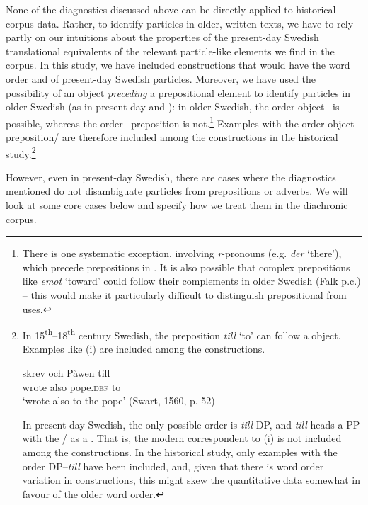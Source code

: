 \documentclass[output=paper]{langscibook}
\begin{document}
None of the diagnostics discussed above can be directly applied to historical corpus data. Rather, to identify particles in older, written texts, we have to rely partly on our intuitions about the properties of the present-day Swedish translational equivalents of the relevant particle-like elements we find in the corpus. In this study, we have included constructions that would have the word order and  of present-day Swedish particles. Moreover, we have used the possibility of an object \textit{preceding} a prepositional element to identify particles in older Swedish (as in present-day  and ): in older Swedish, the order object– is possible, whereas the order –preposition is not.\footnote{There is one systematic exception, involving \textit{r}{}-pronouns (e.g. \textit{der} ‘there’), which precede prepositions in  \citep{Delsing2014Svenskans}. It is also possible that complex prepositions like \textit{emot} ‘toward’ could follow their complements in older Swedish (Falk p.c.) – this would make it particularly difficult to distinguish prepositional from  uses.}  Examples with the order object–preposition/ are therefore included among the  constructions in the historical study.\footnote{In
    15\textsuperscript{th}--18\textsuperscript{th} century Swedish, the preposition \textit{till} ‘to’ can follow a  object. Examples like (i) are included among the  constructions.

    \ea
    \gll skrev   och   Påwen   till\\
    wrote   also  pope.\textsc{def}   to\\
    \glt ‘wrote also to the pope’ (Swart, 1560, p. 52)
    \z

    In present-day Swedish, the only possible order is \textit{till}-DP, and \textit{till} heads a PP with the / as a . That is, the modern correspondent to (i) is not included among the  constructions. In the historical study, only examples with the order DP–\textit{till} have been included, and, given that there is word order variation in  constructions, this might skew the quantitative data somewhat in favour of the older word order.
}



However, even in present-day Swedish, there are cases where the diagnostics mentioned do not disambiguate particles from prepositions or adverbs. We will look at some core cases below and specify how we treat them in the diachronic corpus.
\end{document}
